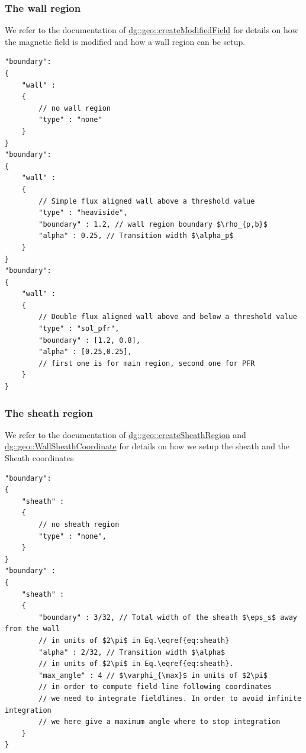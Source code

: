 \subsubsection{The wall region}\label{sec:wall}
We refer to the documentation of
\href{
https://feltor-dev.github.io/feltor/geometries/html/group__wall.html#gac47e668c6483d6cebfc9d6c798737b58
}{dg::geo::createModifiedField} for details on how the magnetic field is modified
and how a wall region can be setup.
\begin{verbatim}
"boundary":
{
    "wall" :
    {
        // no wall region
        "type" : "none"
    }
}
"boundary":
{
    "wall" :
    {
        // Simple flux aligned wall above a threshold value
        "type" : "heaviside",
        "boundary" : 1.2, // wall region boundary $\rho_{p,b}$
        "alpha" : 0.25, // Transition width $\alpha_p$
    }
}
"boundary":
{
    "wall" :
    {
        // Double flux aligned wall above and below a threshold value
        "type" : "sol_pfr",
        "boundary" : [1.2, 0.8],
        "alpha" : [0.25,0.25],
        // first one is for main region, second one for PFR
    }
}
\end{verbatim}
\noindent

\subsubsection{The sheath region}\label{sec:sheath}
We refer to the documentation of \href{https://feltor-dev.github.io/feltor/geometries/html/group__wall.html#ga142938afd77c858f99bd4d215e87bd31}{dg::geo::createSheathRegion}
and
\href{https://feltor-dev.github.io/feltor/geometries/html/structdg_1_1geo_1_1_wall_fieldline_coordinate.html}{dg::geo::WallSheathCoordinate}
for details on how we setup the sheath and the Sheath coordinates
\begin{verbatim}
"boundary":
{
    "sheath" :
    {
        // no sheath region
        "type" : "none",
    }
}
"boundary" :
{
    "sheath" :
    {
        "boundary" : 3/32, // Total width of the sheath $\eps_s$ away from the wall
        // in units of $2\pi$ in Eq.\eqref{eq:sheath}
        "alpha" : 2/32, // Transition width $\alpha$
        // in units of $2\pi$ in Eq.\eqref{eq:sheath}.
        "max_angle" : 4 // $\varphi_{\max}$ in units of $2\pi$
        // in order to compute field-line following coordinates
        // we need to integrate fieldlines. In order to avoid infinite integration
        // we here give a maximum angle where to stop integration
    }
}
\end{verbatim}
\noindent

